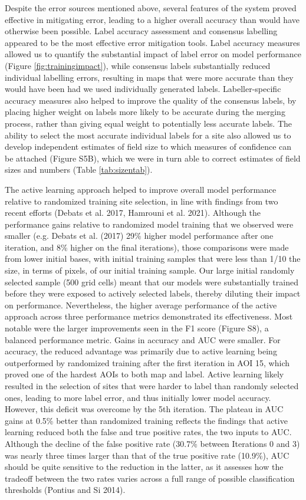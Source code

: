 \documentclass[11pt,a4paper]{article}
\begin{document}
Despite the error sources mentioned above, several features of the
system proved effective in mitigating error, leading to a higher overall
accuracy than would have otherwise been possible. Label accuracy
assessment and consensus labelling appeared to be the most effective
error mitigation tools. Label accuracy measures allowed us to quantify
the substantial impact of label error on model performance (Figure
\ref{fig:trainingimpact}), while consensus labels substantially reduced
individual labelling errors, resulting in maps that were more accurate
than they would have been had we used individually generated labels.
Labeller-specific accuracy measures also helped to improve the quality
of the consensus labels, by placing higher weight on labels more likely
to be accurate during the merging process, rather than giving equal
weight to potentially less accurate labels. The ability to select the
most accurate individual labels for a site also allowed us to develop
independent estimates of field size to which measures of confidence can
be attached (Figure S5B), which we were in turn able to correct
estimates of field sizes and numbers (Table \ref{tab:sizentab}).

The active learning approach helped to improve overall model performance
relative to randomized training site selection, in line with findings
from two recent efforts (Debats et al. 2017, Hamrouni et al. 2021).
Although the performance gains relative to randomized model training
that we observed were smaller (e.g. Debats et al. (2017) 29\% higher
model performance after one iteration, and 8\% higher on the final
iterations), those comparisons were made from lower initial bases, with
initial training samples that were less than 1/10 the size, in terms of
pixels, of our initial training sample. Our large initial randomly
selected sample (500 grid cells) meant that our models were
substantially trained before they were exposed to actively selected
labels, thereby diluting their impact on performance. Nevertheless, the
higher average performance of the active approach across three
performance metrics demonstrated its effectiveness. Most notable were
the larger improvements seen in the F1 score (Figure S8), a balanced
performance metric. Gains in accuracy and AUC were smaller. For
accuracy, the reduced advantage was primarily due to active learning
being outperformed by randomized training after the first iteration in
AOI 15, which proved one of the hardest AOIs to both map and label.
Active learning likely resulted in the selection of sites that were
harder to label than randomly selected ones, leading to more label
error, and thus initially lower model accuracy. However, this deficit
was overcome by the 5th iteration. The plateau in AUC gains at 0.5\%
better than randomized training reflects the findings that active
learning reduced both the false and true positive rates, the two inputs
to AUC. Although the decline of the false positive rate (30.7\% between
Iterations 0 and 3) was nearly three times larger than that of the true
positive rate (10.9\%), AUC should be quite sensitive to the reduction
in the latter, as it assesses how the tradeoff between the two rates
varies across a full range of possible classification thresholds
(Pontius and Si 2014).
\end{document}

